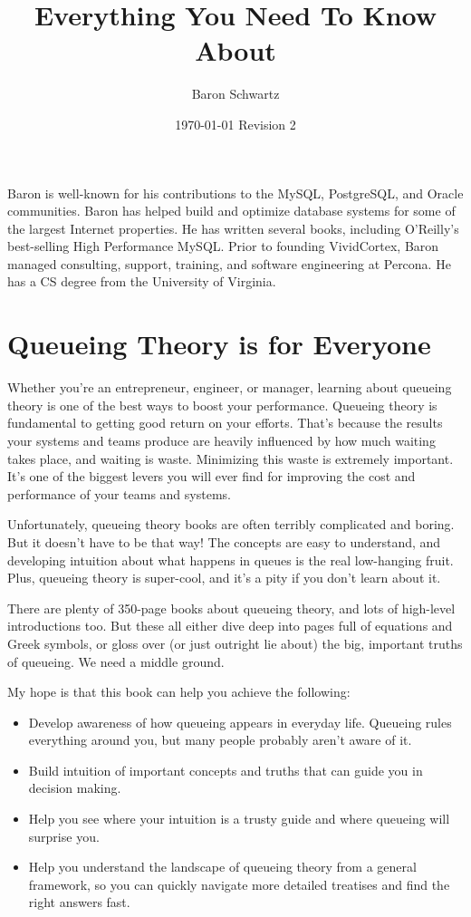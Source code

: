 \documentclass{vivid_layout}
\title{Everything You Need To Know About}{Queueing Theory}
\date{\today{} \textbullet{} Revision 2}
\author{Baron Schwartz}{img/baron}
\begin{document}
\maketitle		%
\begin{bio}		%
Baron is well-known for his contributions to the MySQL, PostgreSQL, and Oracle communities. Baron has helped build and optimize database systems for some of the largest Internet properties. He has written several books, including O'Reilly's best-selling High Performance MySQL. Prior to founding VividCortex, Baron managed consulting, support, training, and software engineering at Percona. He has a CS degree from the University of Virginia.
\end{bio}
\tableofcontents	%

\section{Queueing Theory is for Everyone}

Whether you're an entrepreneur, engineer, or manager, learning about queueing theory is one of the best ways to boost your performance. Queueing theory is fundamental to getting good return on your efforts. That's because the results your systems and teams produce are heavily influenced by how much waiting takes place, and waiting is waste. Minimizing this waste is extremely important. It's one of the biggest levers you will ever find for improving the cost and performance of your teams and systems.

Unfortunately, queueing theory books are often terribly complicated and boring. But it doesn't have to be that way! The concepts are easy to understand, and developing intuition about what happens in queues is the real low-hanging fruit. Plus, queueing theory is super-cool, and it's a pity if you don't learn about it.

There are plenty of 350-page books about queueing theory, and lots of high-level introductions too. But these all either dive deep into pages full of equations and Greek symbols, or gloss over (or just outright lie about) the big, important truths of queueing. We need a middle ground.

My hope is that this book can help you achieve the following:

\begin{itemize}
\item Develop awareness of how queueing appears in everyday life. Queueing rules everything around you, but many people probably aren't aware of it.
\item Build intuition of important concepts and truths that can guide you in decision making.
\item Help you see where your intuition is a trusty guide and where queueing will surprise you.
\item Help you understand the landscape of queueing theory from a general framework, so you can quickly navigate more detailed treatises and find the right answers fast.
\end{itemize}
\end{document}
